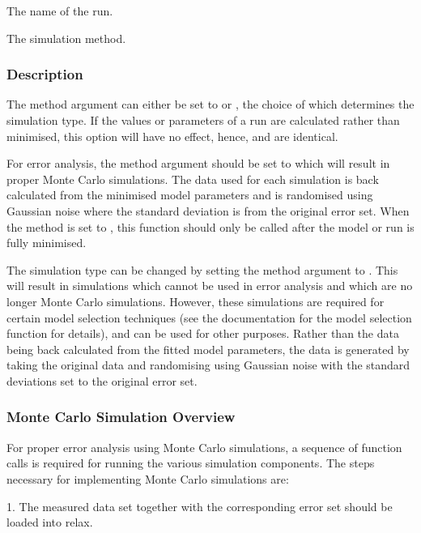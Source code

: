   The name of the run. 

  The simulation method. 




\subsubsection{Description}

The method argument can either be set to  or , the choice of which determines the simulation type.  If the values or parameters of a run are calculated rather than minimised, this option will have no effect, hence,  and  are identical.


For error analysis, the method argument should be set to  which will result in proper Monte Carlo simulations.  The data used for each simulation is back calculated from the minimised model parameters and is randomised using Gaussian noise where the standard deviation is from the original error set.  When the method is set to , this function should only be called after the model or run is fully minimised.


The simulation type can be changed by setting the method argument to .  This will result in simulations which cannot be used in error analysis and which are no longer Monte Carlo simulations.  However, these simulations are required for certain model selection techniques (see the documentation for the model selection function for details), and can be used for other purposes.  Rather than the data being back calculated from the fitted model parameters, the data is generated by taking the original data and randomising using Gaussian noise with the standard deviations set to the original error set.



\subsubsection{Monte Carlo Simulation Overview}

For proper error analysis using Monte Carlo simulations, a sequence of function calls is required for running the various simulation components.  The steps necessary for implementing Monte Carlo simulations are:


1.  The measured data set together with the corresponding error set should be loaded into relax.


